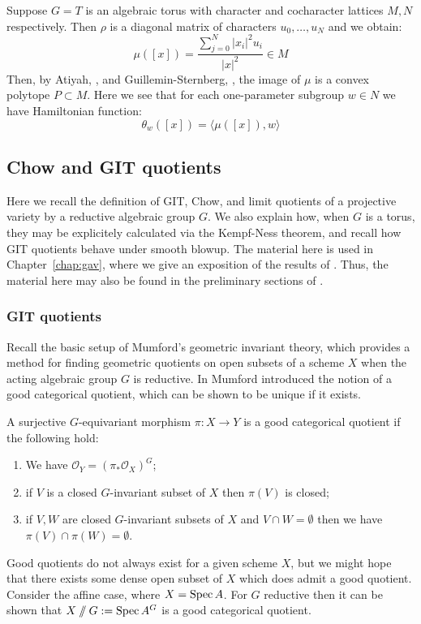 \begin{example}
Suppose \(G = T\) is an algebraic torus with character and cocharacter lattices \(M,N\) respectively. Then \(\rho\) is a diagonal matrix of characters \(u_0,\dots,u_{N}\) and we obtain:
\[
\mu([x]) = \frac{\sum_{j=0}^N |x_i|^2 u_i}{|x|^2} \in M
\]
Then, by Atiyah, \cite{atiyah1982convexity}, and Guillemin-Sternberg, \cite{guillemin1982convexity}, the image of \(\mu\) is a convex polytope \(P \subset M\). Here we see that for each one-parameter subgroup \(w \in N\) we have Hamiltonian function:
\[
\theta_w([x]) = \langle \mu([x]), w \rangle  
\]
\end{example}
\subsection{Chow and GIT quotients} \label{basics:Chowquotients}
Here we recall the definition of GIT, Chow, and limit quotients of a projective variety by a reductive algebraic group \(G\). We also explain how, when \(G\) is a torus, they may be explicitely calculated via the Kempf-Ness theorem, and recall how GIT quotients behave under smooth blowup. The material here is used in Chapter~\ref{chap:gav}, where we give an exposition of the results of \cite{cable2019general}. Thus, the material here may also be found in the preliminary sections of \cite{cable2019general}.
\subsubsection{GIT quotients}
Recall the basic setup of Mumford's geometric invariant theory, which provides a method for finding geometric quotients on open subsets of a scheme \(X\) when the acting algebraic group \(G\) is reductive.
%
%
%
In \cite{mumford1994} Mumford introduced the notion of a good categorical quotient, which can be shown to be unique if it exists.
%
%
%
\begin{definition}
A surjective \(G\)-equivariant morphism \(\pi : X \to Y\) is a good categorical quotient if the following hold:
\begin{enumerate}
\item We have \(\mathcal{O}_Y = (\pi_* \mathcal{O}_X)^G\);
\item if \(V\) is a closed \(G\)-invariant subset of \(X\) then \(\pi(V)\) is closed;
\item if \(V,W\) are closed \(G\)-invariant subsets of \(X\) and \(V \cap W = \emptyset\) then we have \(\pi(V) \cap \pi(W) = \emptyset\).
\end{enumerate}
\end{definition}
%
%
%
Good quotients do not always exist for a given scheme \(X\), but we might hope that there exists some dense open subset of \(X\) which does admit a good quotient. Consider the affine case, where \(X = \operatorname{Spec} A\). For \(G\) reductive then it can be shown that \(X \sslash G : = \operatorname{Spec} A^G\) is a good categorical quotient.

